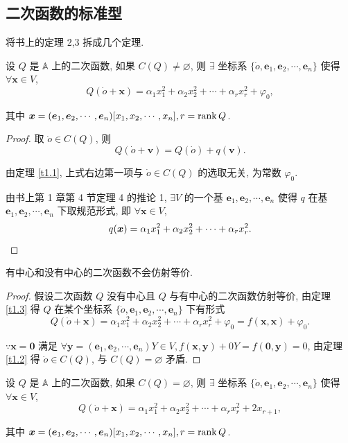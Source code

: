 \documentclass[color=black,device=normal,lang=cn,mode=geye]{elegantnote}
\begin{document}
\subsection{二次函数的标准型}
将书上的定理 2,3 拆成几个定理.
\begin{theorem}\label{t1.3}
    设 $Q$ 是 $\mathbb{A}$ 上的二次函数, 如果 $C(Q)\neq\varnothing$, 则 $\exists$ 坐标系 $\{\dot{o},\boldsymbol{e}_1,\boldsymbol{e}_2,\cdots,\boldsymbol{e}_n\}$ 使得 $\forall\boldsymbol{x}\in V$,
    \[Q(\dot{o}+\boldsymbol{x})=\alpha_1x^2_1+\alpha_2x^2_2+\cdots+\alpha_rx^2_r+\varphi_0,\]

    其中 $\boldsymbol{x}=(\boldsymbol{e}_1,\boldsymbol{e}_2,\cdots,\boldsymbol{e}_n)[x_1,x_2,\cdots,x_n],r=\operatorname{rank} Q$.
\end{theorem}
\begin{proof}
    取 $\dot{o}\in C(Q)$, 则
    \[Q(\dot{o}+\boldsymbol{v})=Q(\dot{o})+q(\boldsymbol{v}).\]

    由定理 \ref{t1.1}, 上式右边第一项与 $\dot{o}\in C(Q)$ 的选取无关, 为常数 $\varphi_0$.

    由书上第 1 章第 4 节定理 4 的推论 1, $\exists V$ 的一个基 $\boldsymbol{e}_1,\boldsymbol{e}_2,\cdots,\boldsymbol{e}_n$ 使得 $q$ 在基 $\boldsymbol{e}_1,\boldsymbol{e}_2,\cdots,\boldsymbol{e}_n$ 下取规范形式, 即 $\forall\boldsymbol{x}\in V$,
    \[q(\boldsymbol{x})=\alpha_1x^2_1+\alpha_2x^2_2+\cdots+\alpha_rx^2_r.\qedhere\]
\end{proof}
\begin{lemma}\label{l1.1}
    有中心和没有中心的二次函数不会仿射等价.
\end{lemma}
\begin{proof}
    假设二次函数 $Q$ 没有中心且 $Q$ 与有中心的二次函数仿射等价, 由定理 \ref{t1.3} 得 $Q$ 在某个坐标系 $\{\dot{o},\boldsymbol{e}_1,\boldsymbol{e}_2,\cdots,\boldsymbol{e}_n\}$ 下有形式
    \[Q(\dot{o}+\boldsymbol{x})=\alpha_1x^2_1+\alpha_2x^2_2+\cdots+\alpha_rx^2_r+\varphi_0=f(\boldsymbol{x},\boldsymbol{x})+\varphi_0.\]

    $\because\boldsymbol{x}=\boldsymbol{0}$ 满足 $\forall\boldsymbol{y}=(\boldsymbol{e}_1,\boldsymbol{e}_2,\cdots,\boldsymbol{e}_n)Y\in V,f(\boldsymbol{x},\boldsymbol{y})+0Y=f(\boldsymbol{0},\boldsymbol{y})=0$, 由定理 \ref{t1.2} 得 $\dot{o}\in C(Q)$, 与 $C(Q)=\varnothing$ 矛盾.
\end{proof}
\begin{theorem}
    设 $Q$ 是 $\mathbb{A}$ 上的二次函数, 如果 $C(Q)=\varnothing$, 则 $\exists$ 坐标系 $\{\dot{o},\boldsymbol{e}_1,\boldsymbol{e}_2,\cdots,\boldsymbol{e}_n\}$ 使得 $\forall\boldsymbol{x}\in V$,
    \[Q(\dot{o}+\boldsymbol{x})=\alpha_1x^2_1+\alpha_2x^2_2+\cdots+\alpha_rx^2_r+2x_{r+1},\]

    其中 $\boldsymbol{x}=(\boldsymbol{e}_1,\boldsymbol{e}_2,\cdots,\boldsymbol{e}_n)[x_1,x_2,\cdots,x_n],r=\operatorname{rank} Q$.
\end{theorem}
\end{document}
